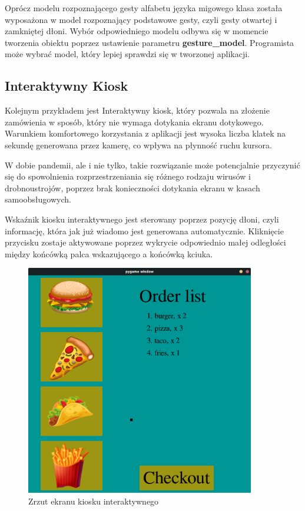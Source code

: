 \quad Oprócz modelu rozpoznającego gesty alfabetu języka migowego klasa została wyposażona w model rozpoznający podstawowe gesty, czyli gesty otwartej i zamkniętej dłoni. Wybór odpowiedniego modelu odbywa się w momencie tworzenia obiektu poprzez ustawienie parametru \textbf{gesture\_model}. Programista może wybrać model, który lepiej sprawdzi się w tworzonej aplikacji.\newline\newline\newline

\subsection{Interaktywny Kiosk}

\quad Kolejnym przykładem jest Interaktywny kiosk, który pozwala na złożenie zamówienia w sposób, który nie wymaga dotykania ekranu dotykowego. Warunkiem komfortowego korzystania z aplikacji jest wysoka liczba klatek na sekundę generowana przez kamerę, co wpływa na płynność ruchu kursora. 

\quad W dobie pandemii, ale i nie tylko, takie rozwiązanie może potencjalnie przyczynić się do spowolnienia rozprzestrzeniania się różnego rodzaju wirusów i drobnoustrojów, poprzez brak konieczności dotykania ekranu w kasach samoobsługowych.

\quad Wskaźnik kiosku interaktywnego jest sterowany poprzez pozycję dłoni, czyli informację, która jak już wiadomo jest generowana automatycznie. Kliknięcie przycisku zostaje aktywowane poprzez wykrycie odpowiednio małej odległości między końcówką palca wskazującego a końcówką kciuka. 

\begin{figure}[H]
    \begin{center}
        \includegraphics[width=10cm]{../images/checkout_window.png}
        \caption{Zrzut ekranu kiosku interaktywnego}
    \end{center}
\end{figure}

